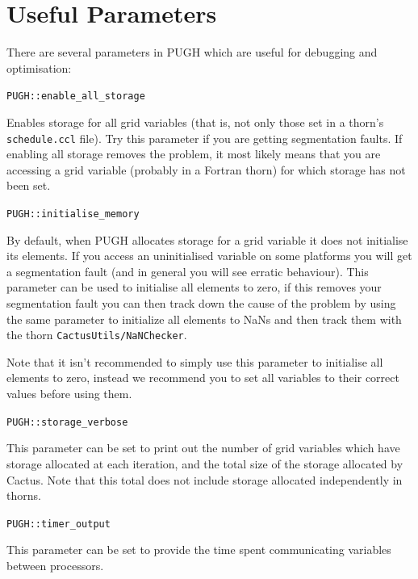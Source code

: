 \documentclass{article}
\begin{document}
\section{Useful Parameters}

There are several parameters in PUGH which are useful for debugging and
optimisation:

\begin{Lentry}

\item[{\tt PUGH::enable\_all\_storage}]

Enables storage for all grid variables (that is, not only
those set in a thorn's {\tt schedule.ccl} file). Try this parameter
if you are getting segmentation faults.  If enabling all storage
removes the problem, it most likely means that you are accessing
a grid variable (probably in a Fortran thorn) for which storage
has not been set.

\item[{\tt PUGH::initialise\_memory}]

By default, when PUGH allocates storage for a grid variable it
does not initialise its elements. If you access an
uninitialised variable on some platforms you will get a
segmentation fault (and in general you will see erratic
behaviour). This parameter can be used to initialise all
elements to zero, if this removes your segmentation fault you
can then track down the cause of the problem by using the same
parameter to initialize all elements to NaNs and then track
them with the thorn {\tt CactusUtils/NaNChecker}.

   Note that it isn't recommended to simply use this parameter to
initialise all elements to zero, instead we recommend you to
set all variables to their correct values before using them.

\item[{\tt PUGH::storage\_verbose}]

This parameter can be set to print out the number of grid variables
which have storage allocated at each iteration, and the total
size of the storage allocated by Cactus. Note that this total
does not include storage allocated independently in thorns.

\item[{\tt PUGH::timer\_output}]

This parameter can be set to provide the time spent communicating
variables between processors.

\end{Lentry}

\end{document}
